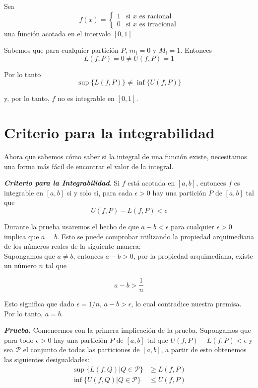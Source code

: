 \documentclass{report}
\begin{document}
    \begin{Example}
        Sea $$f(x) =
        \begin{cases}
        1 & \text{si } x \text{ es racional} \\
        0 & \text{si } x \text{ es irracional}
        \end{cases}$$
        una función acotada en el intervalo $[0,1]$

        Sabemos que para cualquier partición $P$, $m_i = 0$ y $M_i = 1$. Entonces
        $$ L(f, P) = 0 \neq U(f, P) = 1$$

        Por lo tanto
        $$\sup\{L(f, P)\} \neq \inf\{U(f, P)\}$$

        y, por lo tanto, $f$ no es integrable en $[0,1]$.
    \end{Example}

    \section{Criterio para la integrabilidad}
    Ahora que sabemos cómo saber si la integral de una función existe, necesitamos una forma más fácil de encontrar el valor de la integral.

    \begin{thBox}
        \textit{\textbf{Criterio para la Integrabilidad}}. Si $f$ está acotada en $[a,b]$, entonces $f$ es integrable en $[a,b]$ si y solo si, para cada $\epsilon > 0$ hay una partición $P$ de $[a,b]$ tal que
        $$U(f,P)- L(f,P) < \epsilon$$
    \end{thBox}

    \begin{noteBox}
        Durante la prueba usaremos el hecho de que $a-b < \epsilon$ para cualquier $\epsilon > 0$ implica que $a = b$. Esto se puede comprobar utilizando la propiedad arquimediana de los números reales de la siguiente manera:\\

        Supongamos que $a \neq b$, entonces $a-b > 0$, por la propiedad arquimediana, existe un número $n$ tal que

        $$a-b > \frac{1}{n}$$

        Esto significa que dado $\epsilon = 1/n$, $a-b>\epsilon$, lo cual contradice nuestra premisa. Por lo tanto, $a=b$.
    \end{noteBox}

    \textit{\textbf{Prueba.}} Comencemos con la primera implicación de la prueba. Supongamos que para todo $\epsilon > 0$ hay una partición $P$ de $[a,b]$ tal que $U(f, P) - L(f, P) < \epsilon$ y sea $\mathcal{P}$ el conjunto de todas las particiones de $[a,b]$, a partir de esto obtenemos las siguientes desigualdades:
    \begin{align}
        \sup\{L(f, Q) | Q \in \mathcal{P}\} &\geq L(f,P)\\
        \inf\{U(f, Q) | Q \in \mathcal{P}\} &\leq U(f,P)
    \end{align}
\end{document}
